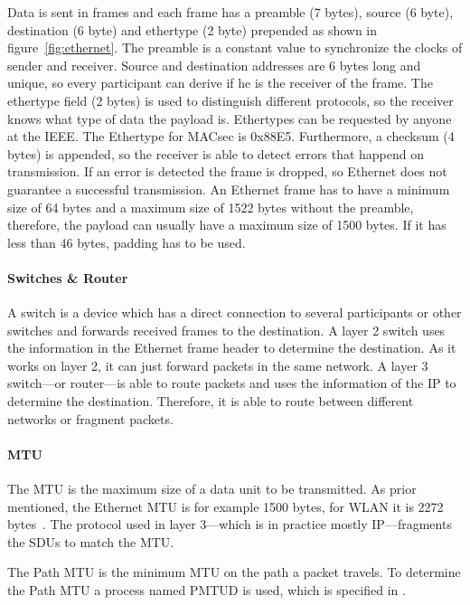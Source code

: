 Data is sent in frames and each frame has a preamble (7 bytes), source (6 byte), destination (6 byte) and ethertype (2 byte) prepended as shown in figure~\ref{fig:ethernet}.
The preamble is a constant value to synchronize the clocks of sender and receiver.
Source and destination addresses are 6 bytes long and unique, so every participant can derive if he is the receiver of the frame.
The ethertype field (2 bytes) is used to distinguish different protocols, so the receiver knows what type of data the payload is.
Ethertypes can be requested by anyone at the \gls{IEEE}.
The Ethertype for \gls{MACsec} is 0x88E5.
Furthermore, a checksum (4 bytes) is appended, so the receiver is able to detect errors that happend on transmission.
If an error is detected the frame is dropped, so Ethernet does not guarantee a successful transmission.
An Ethernet frame has to have a minimum size of 64 bytes and a maximum size of 1522 bytes without the preamble, therefore, the payload can usually have a maximum size of 1500 bytes.
If it has less than 46 bytes, padding has to be used.

\paragraph{Switches \& Router}
A switch is a device which has a direct connection to several participants or other switches and forwards received frames to the destination.
A layer 2 switch uses the information in the Ethernet frame header to determine the destination.
As it works on layer 2, it can just forward packets in the same network.
A layer 3 switch---or router---is able to route packets and uses the information of the \gls{IP} to determine the destination.
Therefore, it is able to route between different networks or fragment packets.

\paragraph{MTU}
The \acrfull{MTU} is the maximum size of a data unit to be transmitted.
As prior mentioned, the Ethernet \gls{MTU} is for example 1500 bytes, for \acrlong{WLAN} it is 2272 bytes~\cite{ieeewlan}.
The protocol used in layer 3---which is in practice mostly \gls{IP}---fragments the \glspl{SDU} to match the \gls{MTU}.

The Path \gls{MTU} is the minimum \gls{MTU} on the path a packet travels.
To determine the Path \gls{MTU} a process named \gls{PMTUD} is used, which is specified in \cite{RFC1191}.

